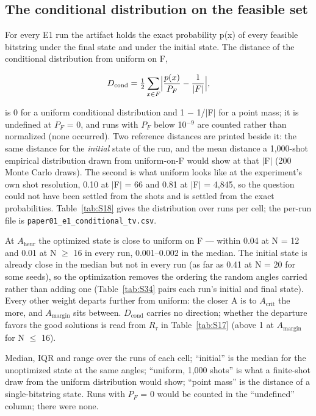 \documentclass[journal]{IEEEtran}
\begin{document}
\subsection{The conditional distribution on the feasible set}


For every E1 run the artifact holds the exact probability p(x) of every feasible bitstring under the final state and under the initial state. The distance of the conditional distribution from uniform on F,


\begin{equation*}
D_{\mathrm{cond}} = \tfrac{1}{2}\sum_{x \in F}\Bigl|\frac{p(x)}{P_F} - \frac{1}{|F|}\Bigr|,
\end{equation*}


is 0 for a uniform conditional distribution and 1 $-$ 1/$|$F$|$ for a point mass; it is undefined at $P_{F}$ = 0, and runs with $P_{F}$ below 10$^{-9}$ are counted rather than normalized (none occurred). Two reference distances are printed beside it: the same distance for the \textit{initial} state of the run, and the mean distance a 1,000-shot empirical distribution drawn from uniform-on-F would show at that $|$F$|$ (200 Monte Carlo draws). The second is what uniform looks like at the experiment's own shot resolution, 0.10 at $|$F$|$ = 66 and 0.81 at $|$F$|$ = 4,845, so the question could not have been settled from the shots and is settled from the exact probabilities. Table~\ref{tab:S18} gives the distribution over runs per cell; the per-run file is \texttt{paper01\_e1\_conditional\_tv.csv}.


At $A_{\mathrm{heur}}$ the optimized state is close to uniform on F --- within 0.04 at N = 12 and 0.01 at N $\geq$ 16 in every run, 0.001--0.002 in the median. The initial state is already close in the median but not in every run (as far as 0.41 at N = 20 for some seeds), so the optimization removes the ordering the random angles carried rather than adding one (Table~\ref{tab:S34} pairs each run's initial and final state). Every other weight departs further from uniform: the closer A is to $A_{\mathrm{crit}}$ the more, and $A_{\mathrm{margin}}$ sits between. $D_{\mathrm{cond}}$ carries no direction; whether the departure favors the good solutions is read from $R_{\tau}$ in Table~\ref{tab:S17} (above 1 at $A_{\mathrm{margin}}$ for N $\leq$ 16).


Median, IQR and range over the runs of each cell; ``initial'' is the median for the unoptimized state at the same angles; ``uniform, 1,000 shots'' is what a finite-shot draw from the uniform distribution would show; ``point mass'' is the distance of a single-bitstring state. Runs with $P_{F}$ = 0 would be counted in the ``undefined'' column; there were none.
\end{document}
